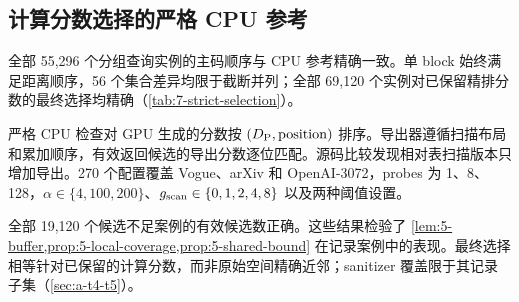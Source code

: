 \subsection{计算分数选择的严格 CPU 参考}
\label{sec:7-strict-selection}

全部 55,296 个分组查询实例的主码顺序与 CPU 参考精确一致。单 block 始终满足距离顺序，56 个集合差异均限于截断并列；全部 69,120 个实例对已保留精排分数的最终选择均精确（\cref{tab:7-strict-selection}）。

严格 CPU 检查对 GPU 生成的分数按 $(D_{\mathrm{P}},\mathrm{position})$ 排序。导出器遵循扫描布局和累加顺序，有效返回候选的导出分数逐位匹配。源码比较发现相对表扫描版本只增加导出。270 个配置覆盖 Vogue、arXiv 和 OpenAI-3072，probes 为 1、8、128，$\alpha\in\{4,100,200\}$、$g_{\mathrm{scan}}\in\{0,1,2,4,8\}$ 以及两种阈值设置。

\suppressfloats[t]
\begin{table}[!htbp]
\centering
\caption[严格计算分数选择检查]{严格选择检查 CPU 参考检查。集合与顺序相等使用完整主码键。有效计数检查 $\min(c,n_c)$ 个保留候选；最终相等按 $(\refineddist,\mathrm{ID})$ 对保留的计算精排分数排序，包含其 FP32 bits。计数为查询实例，同一查询跨配置复用。}
\label{tab:7-strict-selection}
\footnotesize\setlength{\tabcolsep}{3pt}

\end{table}

全部 19,120 个候选不足案例的有效候选数正确。这些结果检验了 \cref{lem:5-buffer,prop:5-local-coverage,prop:5-shared-bound} 在记录案例中的表现。最终选择相等针对已保留的计算分数，而非原始空间精确近邻；sanitizer 覆盖限于其记录子集（\cref{sec:a-t4-t5}）。
